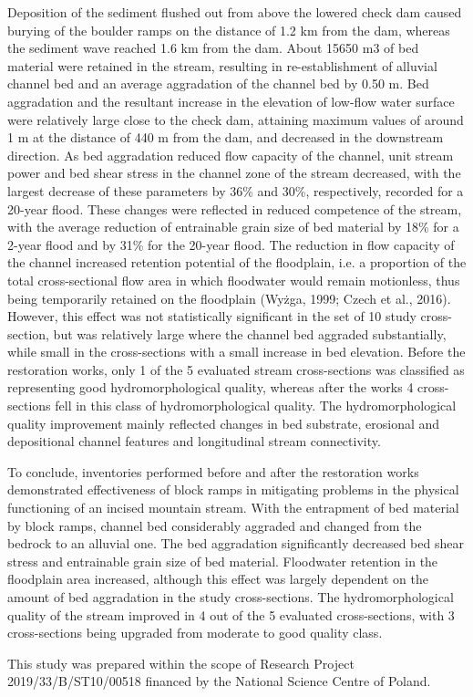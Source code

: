 {Deposition of the sediment flushed out from above the lowered check dam caused burying of the boulder ramps on the distance of 1.2 km from the dam, whereas the sediment wave reached 1.6 km from the dam. About 15650 m3 of bed material were retained in the stream, resulting in re-establishment of alluvial channel bed and an average aggradation of the channel bed by 0.50 m. Bed aggradation and the resultant increase in the elevation of low-flow water surface were relatively large close to the check dam, attaining maximum values of around 1 m at the distance of 440 m from the dam, and decreased in the downstream direction. As bed aggradation reduced flow capacity of the channel, unit stream power and bed shear stress in the channel zone of the stream decreased, with the largest decrease of these parameters by 36\% and 30\%, respectively, recorded for a 20-year flood. These changes were reflected in reduced competence of the stream, with the average reduction of entrainable grain size of bed material by 18\% for a 2-year flood and by 31\% for the 20-year flood. The reduction in flow capacity of the channel increased retention potential of the floodplain, i.e. a proportion of the total cross-sectional flow area in which floodwater would remain motionless, thus being temporarily retained on the floodplain (Wyżga, 1999; Czech et al., 2016). However, this effect was not statistically significant in the set of 10 study cross-section, but was relatively large where the channel bed aggraded substantially, while small in the cross-sections with a small increase in bed elevation. Before the restoration works, only 1 of the 5 evaluated stream cross-sections was classified as representing good hydromorphological quality, whereas after the works 4 cross-sections fell in this class of hydromorphological quality. The hydromorphological quality improvement mainly reflected changes in bed substrate, erosional and depositional channel features and longitudinal stream connectivity. 

To conclude, inventories performed before and after the restoration works demonstrated effectiveness of block ramps in mitigating problems in the physical functioning of an incised mountain stream. With the entrapment of bed material by block ramps, channel bed considerably aggraded and changed from the bedrock to an alluvial one. The bed aggradation significantly decreased bed shear stress and entrainable grain size of bed material. Floodwater retention in the floodplain area increased, although this effect was largely dependent on the amount of bed aggradation in the study cross-sections. The hydromorphological quality of the stream improved in 4 out of the 5 evaluated cross-sections, with 3 cross-sections being upgraded from moderate to good quality class. 
	
This study was prepared within the scope of Research Project 2019/33/B/ST10/00518 financed by the National Science Centre of Poland.
}%
